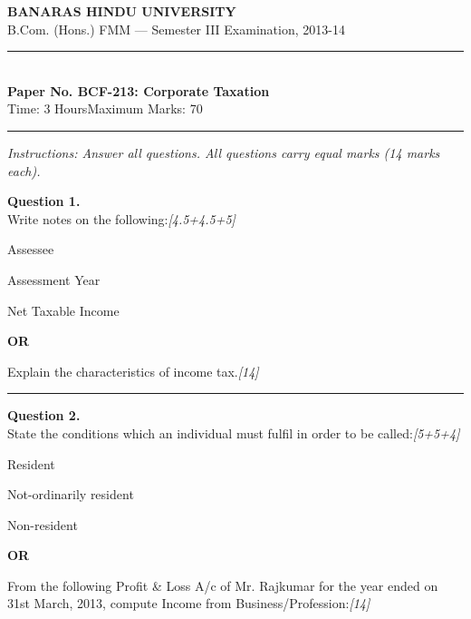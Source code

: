 \documentclass[11pt,a4paper]{article}
\newcommand{\pts}[1]{\hfill   \textit{[#1]}}
\begin{document}
\begin{center}
  {\large\bfseries BANARAS HINDU UNIVERSITY}\\[2pt]
  {\normalsize B.Com. (Hons.) FMM --- Semester III Examination, 2013-14}\\[6pt]
  \rule{0.8\linewidth}{0.5pt}\\[6pt]
  {\large\bfseries Paper No. BCF-213: Corporate Taxation}\\[4pt]
  {\normalsize Time: 3 Hours\hfill Maximum Marks: 70}
\end{center}

\rule{\linewidth}{0.4pt}

\smallskip



\noindent   \textit{Instructions: Answer all questions. All questions carry equal marks (14 marks each).}

\bigskip




\noindent   \textbf{Question 1.} \\
Write notes on the following:\pts{4.5+4.5+5}

\begin{parts}
  \item Assessee
  \item Assessment Year
  \item Net Taxable Income
\end{parts}

\centerline{   \textbf{OR}}

Explain the characteristics of income tax.\pts{14}

\medskip\rule{\linewidth}{0.2pt}




\noindent   \textbf{Question 2.} \\
State the conditions which an individual must fulfil in order to be called:\pts{5+5+4}

\begin{parts}
  \item Resident
  \item Not-ordinarily resident
  \item Non-resident
\end{parts}

\centerline{   \textbf{OR}}

From the following Profit \& Loss A/c of Mr. Rajkumar for the year ended on 31st March, 2013, compute Income from Business/Profession:\pts{14}
\end{document}
